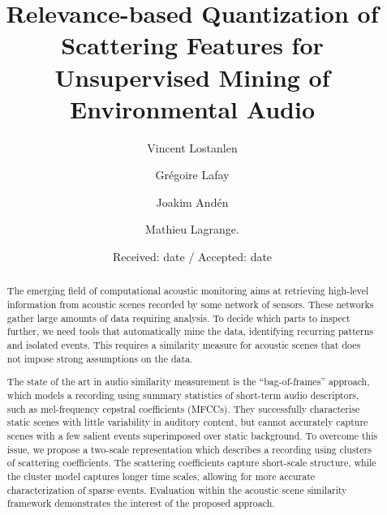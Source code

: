 \documentclass[smallextended]{svjour3}
\begin{document}
%
\title{Relevance-based Quantization of Scattering Features for Unsupervised Mining of Environmental Audio}


\author{Vincent Lostanlen         \and
		Gr\'egoire Lafay  \and Joakim And\'en  \and Mathieu Lagrange.}


\date{Received: date / Accepted: date}



\maketitle

\begin{abstract}
The emerging field of computational acoustic monitoring aims at retrieving high-level information from acoustic scenes recorded by some network of sensors. These networks gather large amounts of data requiring analysis. To decide which parts to inspect further, we need tools that automatically mine the data, identifying recurring patterns and isolated events. This requires a similarity measure for acoustic scenes that does not impose strong assumptions on the data.

The state of the art in audio similarity measurement is the ``bag-of-frames'' approach, which models a recording using summary statistics of short-term audio descriptors, such as mel-frequency cepstral coefficients (MFCCs). They successfully characterise static scenes with little variability in auditory content, but cannot accurately capture scenes with a few salient events superimposed over static background.
To overcome this issue, we propose a two-scale representation which describes a recording using clusters of scattering coefficients. The scattering coefficients capture short-scale structure, while the cluster model captures longer time scales, allowing for more accurate characterization of sparse events. Evaluation within the acoustic scene similarity framework demonstrates the interest of the proposed approach.
\end{abstract}
\end{document}
